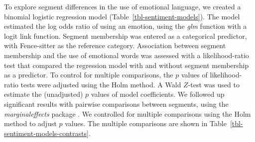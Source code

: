 \documentclass[
  letterpaper,
  DIV=11,
  numbers=noendperiod]{scrartcl}
\begin{document}
To explore segment differences in the use of emotional language, we
created a binomial logistic regression model
(Table~\ref{tbl-sentiment-models}). The model estimated the log odds
ratio of using an emotion, using the \emph{glm} function with a logit
link function. Segment membership was entered as a categorical
predictor, with Fence-sitter as the reference category. Association
between segment membership and the use of emotional words was assessed
with a likelihood-ratio test that compared the regression model with and
without segment membership as a predictor. To control for multiple
comparisons, the \(p\) values of likelihood-ratio tests were adjusted
using the Holm \citeyearpar{holm1979} method. A Wald \(Z\)-test was used
to estimate the (unadjusted) \(p\) values of model coefficients. We
followed up significant results with pairwise comparisons between
segments, using the \emph{marginaleffects} package
\citep{R-marginaleffects}. We controlled for multiple comparisons using
the Holm method \citeyearpar{holm1979} to adjust \(p\) values. The
multiple comparisons are shown in
Table~\ref{tbl-sentiment-models-contrasts}.
\end{document}
